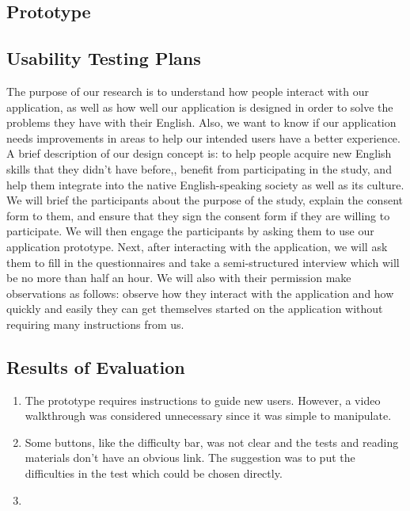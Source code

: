 \documentclass{sigchi}
\begin{document}
\subsection{Prototype}
\subsection{Usability Testing Plans}
The purpose of our research is to understand how people interact with our application, as well as how well our application is designed in order to solve the problems they have with their English. Also, we want to know if our application needs improvements in areas to help our intended users have a better experience. A brief description of our design concept is: to help people acquire new English skills that they didn't have before,, benefit from participating in the study, and help them integrate into the native English-speaking society as well as its culture. We will brief the participants about the purpose of the study, explain the consent form to them, and ensure that they sign the consent form if they are willing to participate. We will then engage the participants by asking them to use our application prototype. Next, after interacting with the application, we will ask them to fill in the questionnaires and take a semi-structured interview which will be no more than half an hour. We will also with their permission make observations as follows: observe how they interact with the application and how quickly and easily they can get themselves started on the application without requiring many instructions from us.
\subsection{Results of Evaluation}
\begin{enumerate}
\item The prototype requires instructions to guide new users. However, a video walkthrough was considered unnecessary since it was simple to manipulate.
\item Some buttons, like the difficulty bar, was not clear and the tests and reading materials don’t have an obvious link. The suggestion was to put the difficulties in the test which could be chosen directly.
\item
\end{enumerate}

\end{document}
